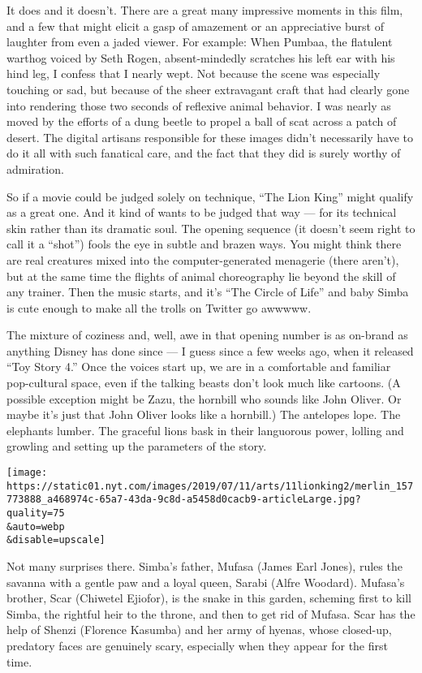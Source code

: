 It does and it doesn't. There are a great many impressive moments in
this film, and a few that might elicit a gasp of amazement or an
appreciative burst of laughter from even a jaded viewer. For example:
When Pumbaa, the flatulent warthog voiced by Seth Rogen, absent-mindedly
scratches his left ear with his hind leg, I confess that I nearly wept.
Not because the scene was especially touching or sad, but because of the
sheer extravagant craft that had clearly gone into rendering those two
seconds of reflexive animal behavior. I was nearly as moved by the
efforts of a dung beetle to propel a ball of scat across a patch of
desert. The digital artisans responsible for these images didn't
necessarily have to do it all with such fanatical care, and the fact
that they did is surely worthy of admiration.

So if a movie could be judged solely on technique, ``The Lion King''
might qualify as a great one. And it kind of wants to be judged that way
--- for its technical skin rather than its dramatic soul. The opening
sequence (it doesn't seem right to call it a ``shot'') fools the eye in
subtle and brazen ways. You might think there are real creatures mixed
into the computer-generated menagerie (there aren't), but at the same
time the flights of animal choreography lie beyond the skill of any
trainer. Then the music starts, and it's ``The Circle of Life'' and baby
Simba is cute enough to make all the trolls on Twitter go awwwww.

The mixture of coziness and, well, awe in that opening number is as
on-brand as anything Disney has done since --- I guess since a few weeks
ago, when it released ``Toy Story 4.'' Once the voices start up, we are
in a comfortable and familiar pop-cultural space, even if the talking
beasts don't look much like cartoons. (A possible exception might be
Zazu, the hornbill who sounds like John Oliver. Or maybe it's just that
John Oliver looks like a hornbill.) The antelopes lope. The elephants
lumber. The graceful lions bask in their languorous power, lolling and
growling and setting up the parameters of the story.

\texttt{[image: https://static01.nyt.com/images/2019/07/11/arts/11lionking2/merlin\_157773888\_a468974c-65a7-43da-9c8d-a5458d0cacb9-articleLarge.jpg?quality=75\\\&auto=webp\\\&disable=upscale]}

Not many surprises there. Simba's father, Mufasa (James Earl Jones),
rules the savanna with a gentle paw and a loyal queen, Sarabi (Alfre
Woodard). Mufasa's brother, Scar (Chiwetel Ejiofor), is the snake in
this garden, scheming first to kill Simba, the rightful heir to the
throne, and then to get rid of Mufasa. Scar has the help of Shenzi
(Florence Kasumba) and her army of hyenas, whose closed-up, predatory
faces are genuinely scary, especially when they appear for the first
time.

